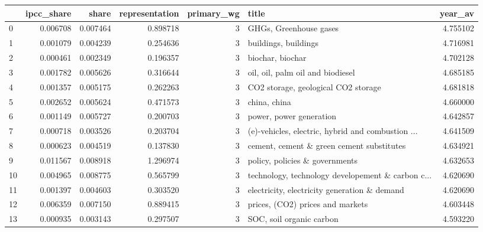 \begin{tabular}{lrrrrlr}
\toprule
{} &  ipcc\_share &     share &  representation &  primary\_wg &                                              title &   year\_av \\
\midrule
0   &    0.006708 &  0.007464 &        0.898718 &           3 &                             GHGs, Greenhouse gases &  4.755102 \\
1   &    0.001079 &  0.004239 &        0.254636 &           3 &                               buildings, buildings &  4.716981 \\
2   &    0.000461 &  0.002349 &        0.196357 &           3 &                                   biochar, biochar &  4.702128 \\
3   &    0.001782 &  0.005626 &        0.316644 &           3 &                   oil, oil, palm oil and biodiesel &  4.685185 \\
4   &    0.001357 &  0.005175 &        0.262263 &           3 &                CO2 storage, geological CO2 storage &  4.681818 \\
5   &    0.002652 &  0.005624 &        0.471573 &           3 &                                       china, china &  4.660000 \\
6   &    0.001149 &  0.005727 &        0.200703 &           3 &                            power, power generation &  4.642857 \\
7   &    0.000718 &  0.003526 &        0.203704 &           3 &  (e)-vehicles, electric, hybrid and combustion ... &  4.641509 \\
8   &    0.000623 &  0.004519 &        0.137830 &           3 &          cement, cement \& green cement substitutes &  4.634921 \\
9   &    0.011567 &  0.008918 &        1.296974 &           3 &                     policy, policies \& governments &  4.632653 \\
10  &    0.004965 &  0.008775 &        0.565799 &           3 &  technology, technology developement \& carbon c... &  4.620690 \\
11  &    0.001397 &  0.004603 &        0.303520 &           3 &       electricity, electricity generation \& demand &  4.620690 \\
12  &    0.006359 &  0.007150 &        0.889415 &           3 &                   prices, (CO2) prices and markets &  4.603448 \\
13  &    0.000935 &  0.003143 &        0.297507 &           3 &                           SOC, soil organic carbon &  4.593220 \\

\end{tabular}
